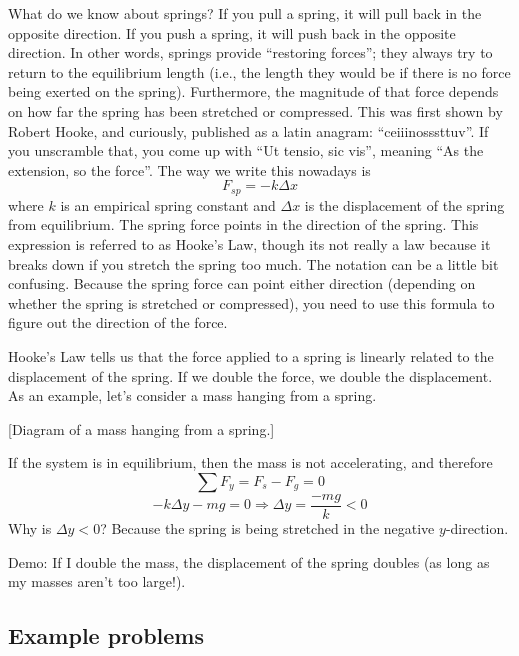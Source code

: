 What do we know about springs? If you pull a spring, it will pull back in the opposite direction. If you push a spring, it will push back in the opposite direction. In other words, springs provide ``restoring forces''; they always try to return to the equilibrium length (i.e., the length they would be if there is no force being exerted on the spring). Furthermore, the magnitude of that force depends on how far the spring has been stretched or compressed. This was first shown by Robert Hooke, and curiously, published as a latin anagram: ``ceiiinosssttuv''. If you unscramble that, you come up with ``Ut tensio, sic vis'', meaning ``As the extension, so the force''. The way we write this nowadays is
$$\boxed{F_{sp}=-k\Delta{x}}$$
where $k$ is an empirical spring constant and $\Delta{x}$ is the displacement of the spring from equilibrium. The spring force points in the direction of the spring. This expression is referred to as Hooke's Law, though its not really a law because it breaks down if you stretch the spring too much. The notation can be a little bit confusing. Because the spring force can point either direction (depending on whether the spring is stretched or compressed), you need to use this formula to figure out the direction of the force.

\vspace{8cm}

Hooke's Law tells us that the force applied to a spring is linearly related to the displacement of the spring. If we double the force, we double the displacement. As an example, let's consider a mass hanging from a spring.


[Diagram of a mass hanging from a spring.]
\vspace{5cm}

If the system is in equilibrium, then the mass is not accelerating, and therefore
$$\sum F_y = F_s-F_g=0$$
$$-k\Delta{y}-mg=0\Rightarrow \Delta{y}=\frac{-mg}{k}<0$$
Why is $\Delta{y}<0$? Because the spring is being stretched in the negative $y$-direction.

\vspace{5cm}

Demo: If I double the mass, the displacement of the spring doubles (as long as my masses aren't too large!).

\subsection{Example problems}

